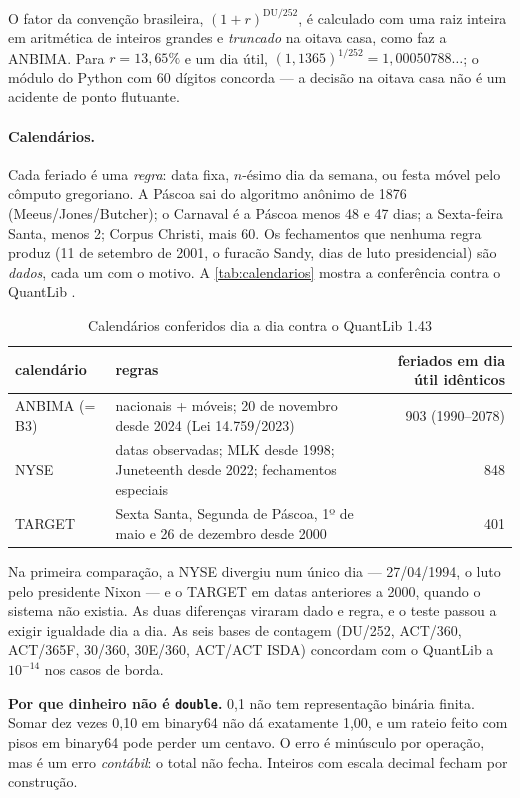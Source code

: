 O fator da convenção brasileira, $(1 + r)^{\mathrm{DU}/252}$, é calculado com uma raiz inteira em aritmética de inteiros grandes e \emph{truncado} na oitava casa, como faz a ANBIMA. Para $r = 13{,}65\%$ e um dia útil, $(1{,}1365)^{1/252} = 1{,}00050788\ldots$; o módulo  do Python com 60 dígitos concorda --- a decisão na oitava casa não é um acidente de ponto flutuante.

\paragraph{Calendários.} Cada feriado é uma \emph{regra}: data fixa, $n$-ésimo dia da semana, ou festa móvel pelo cômputo gregoriano. A Páscoa sai do algoritmo anônimo de 1876 (Meeus/Jones/Butcher); o Carnaval é a Páscoa menos 48 e 47 dias; a Sexta-feira Santa, menos 2; Corpus Christi, mais 60. Os fechamentos que nenhuma regra produz (11 de setembro de 2001, o furacão Sandy, dias de luto presidencial) são \emph{dados}, cada um com o motivo. A \autoref{tab:calendarios} mostra a conferência contra o QuantLib \cite{quantlib}.

\begin{table}[htbp]
\centering
\caption{Calendários conferidos dia a dia contra o QuantLib 1.43}\label{tab:calendarios}
\small
\begin{tabularx}{\textwidth}{@{}lXr@{}}
\toprule
\textbf{calendário} & \textbf{regras} & \textbf{feriados em dia útil idênticos}\\
\midrule
ANBIMA (= B3) & nacionais + móveis; 20 de novembro desde 2024 (Lei 14.759/2023) & 903 (1990--2078)\\
NYSE & datas observadas; MLK desde 1998; Juneteenth desde 2022; fechamentos especiais & 848\\
TARGET & Sexta Santa, Segunda de Páscoa, 1º de maio e 26 de dezembro desde 2000 & 401\\
\bottomrule
\end{tabularx}
\end{table}

Na primeira comparação, a NYSE divergiu num único dia --- 27/04/1994, o luto pelo presidente Nixon --- e o TARGET em datas anteriores a 2000, quando o sistema não existia. As duas diferenças viraram dado e regra, e o teste passou a exigir igualdade dia a dia. As seis bases de contagem (DU/252, ACT/360, ACT/365F, 30/360, 30E/360, ACT/ACT ISDA) concordam com o QuantLib a $10^{-14}$ nos casos de borda.

\begin{graduacao}
\textbf{Por que dinheiro não é \texttt{double}.} 0,1 não tem representação binária finita. Somar dez vezes 0,10 em binary64 não dá exatamente 1,00, e um rateio feito com pisos em binary64 pode perder um centavo. O erro é minúsculo por operação, mas é um erro \emph{contábil}: o total não fecha. Inteiros com escala decimal fecham por construção.
\end{graduacao}

